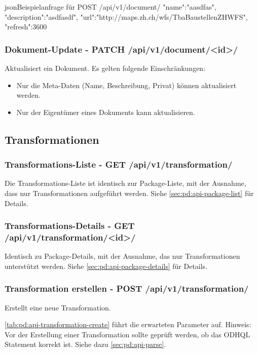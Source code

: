 \begin{srclst}{json}{Beispielanfrage für POST /api/v1/document/}
{
  "name":"aasdfas",
  "description":"asdfasdf",
  "url":"http://maps.zh.ch/wfs/TbaBaustellenZHWFS",
  "refresh":3600
}
\end{srclst}

\subsubsection{Dokument-Update - PATCH /api/v1/document/<id>/}
Aktualisiert ein Dokument. Es gelten folgende Einschränkungen:
\begin{itemize}
\item Nur die Meta-Daten (Name, Beschreibung, Privat) können aktualisiert werden.
\item Nur der Eigentümer eines Dokuments kann aktualisieren.
\end{itemize}
\subsection{Transformationen}
\subsubsection{Transformations-Liste - GET /api/v1/transformation/}
Die Transformations-Liste ist identisch zur Package-Liste, mit der Ausnahme, dass nur Transformationen aufgeführt werden. Siehe \cref{sec:pd:api-package-list} für Details.

\subsubsection{Transformations-Details - GET /api/v1/transformation/<id>/}
Identisch zu Package-Details, mit der Ausnahme, das nur Transformationen unterstützt werden. Siehe \cref{sec:pd:api-package-details} für Details.

\subsubsection{Transformation erstellen - POST /api/v1/transformation/}
Erstellt eine neue Transformation.

\cref{tab:pd:api-transformation-create} führt die erwarteten Parameter auf.
Hinweis: Vor der Erstellung einer Transformation sollte geprüft werden, ob das ODHQL Statement korrekt ist. Siehe dazu \cref{sec:pd:api-parse}.


